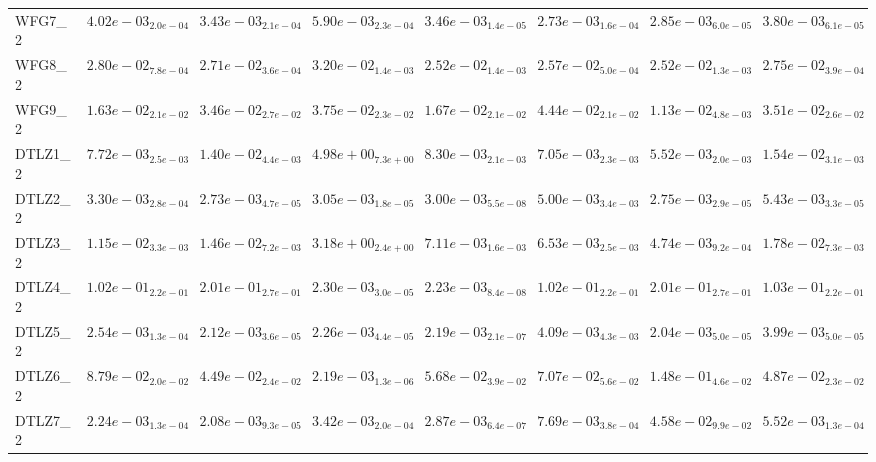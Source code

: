 \documentclass{article}
\begin{document}
\begin{landscape}
\begin{table}
\begin{scriptsize}
\begin{tabular}{llllllll}
WFG7\_2 & $  4.02e-03_{ 2.0e-04}$ & $  3.43e-03_{ 2.1e-04}$ & $  5.90e-03_{ 2.3e-04}$ & $  3.46e-03_{ 1.4e-05}$ & \cellcolor{gray95}$  2.73e-03_{ 1.6e-04}$ & \cellcolor{gray25}$  2.85e-03_{ 6.0e-05}$ & $  3.80e-03_{ 6.1e-05}$ \\
WFG8\_2 & $  2.80e-02_{ 7.8e-04}$ & $  2.71e-02_{ 3.6e-04}$ & $  3.20e-02_{ 1.4e-03}$ & \cellcolor{gray95}$  2.52e-02_{ 1.4e-03}$ & $  2.57e-02_{ 5.0e-04}$ & \cellcolor{gray25}$  2.52e-02_{ 1.3e-03}$ & $  2.75e-02_{ 3.9e-04}$ \\
WFG9\_2 & \cellcolor{gray25}$  1.63e-02_{ 2.1e-02}$ & $  3.46e-02_{ 2.7e-02}$ & $  3.75e-02_{ 2.3e-02}$ & $  1.67e-02_{ 2.1e-02}$ & $  4.44e-02_{ 2.1e-02}$ & \cellcolor{gray95}$  1.13e-02_{ 4.8e-03}$ & $  3.51e-02_{ 2.6e-02}$ \\
DTLZ1\_2 & $  7.72e-03_{ 2.5e-03}$ & $  1.40e-02_{ 4.4e-03}$ & $  4.98e+00_{ 7.3e+00}$ & $  8.30e-03_{ 2.1e-03}$ & \cellcolor{gray25}$  7.05e-03_{ 2.3e-03}$ & \cellcolor{gray95}$  5.52e-03_{ 2.0e-03}$ & $  1.54e-02_{ 3.1e-03}$ \\
DTLZ2\_2 & $  3.30e-03_{ 2.8e-04}$ & \cellcolor{gray95}$  2.73e-03_{ 4.7e-05}$ & $  3.05e-03_{ 1.8e-05}$ & $  3.00e-03_{ 5.5e-08}$ & $  5.00e-03_{ 3.4e-03}$ & \cellcolor{gray25}$  2.75e-03_{ 2.9e-05}$ & $  5.43e-03_{ 3.3e-05}$ \\
DTLZ3\_2 & $  1.15e-02_{ 3.3e-03}$ & $  1.46e-02_{ 7.2e-03}$ & $  3.18e+00_{ 2.4e+00}$ & $  7.11e-03_{ 1.6e-03}$ & \cellcolor{gray25}$  6.53e-03_{ 2.5e-03}$ & \cellcolor{gray95}$  4.74e-03_{ 9.2e-04}$ & $  1.78e-02_{ 7.3e-03}$ \\
DTLZ4\_2 & $  1.02e-01_{ 2.2e-01}$ & $  2.01e-01_{ 2.7e-01}$ & \cellcolor{gray25}$  2.30e-03_{ 3.0e-05}$ & \cellcolor{gray95}$  2.23e-03_{ 8.4e-08}$ & $  1.02e-01_{ 2.2e-01}$ & $  2.01e-01_{ 2.7e-01}$ & $  1.03e-01_{ 2.2e-01}$ \\
DTLZ5\_2 & $  2.54e-03_{ 1.3e-04}$ & \cellcolor{gray25}$  2.12e-03_{ 3.6e-05}$ & $  2.26e-03_{ 4.4e-05}$ & $  2.19e-03_{ 2.1e-07}$ & $  4.09e-03_{ 4.3e-03}$ & \cellcolor{gray95}$  2.04e-03_{ 5.0e-05}$ & $  3.99e-03_{ 5.0e-05}$ \\
DTLZ6\_2 & $  8.79e-02_{ 2.0e-02}$ & \cellcolor{gray25}$  4.49e-02_{ 2.4e-02}$ & \cellcolor{gray95}$  2.19e-03_{ 1.3e-06}$ & $  5.68e-02_{ 3.9e-02}$ & $  7.07e-02_{ 5.6e-02}$ & $  1.48e-01_{ 4.6e-02}$ & $  4.87e-02_{ 2.3e-02}$ \\
DTLZ7\_2 & \cellcolor{gray25}$  2.24e-03_{ 1.3e-04}$ & \cellcolor{gray95}$  2.08e-03_{ 9.3e-05}$ & $  3.42e-03_{ 2.0e-04}$ & $  2.87e-03_{ 6.4e-07}$ & $  7.69e-03_{ 3.8e-04}$ & $  4.58e-02_{ 9.9e-02}$ & $  5.52e-03_{ 1.3e-04}$ \\

\end{tabular}
\end{scriptsize}
\end{table}
\end{landscape}
\end{document}
